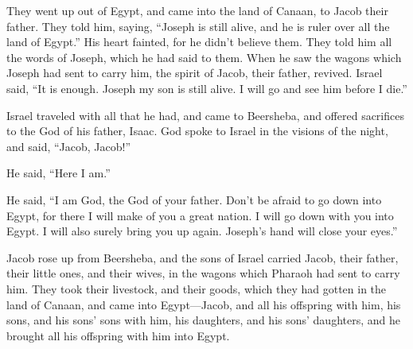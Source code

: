 \myverse{}They went up out of Egypt, and came into the land of Canaan, to Jacob their father.  \myverse{}They told him, saying, “Joseph is still alive, and he is ruler over all the land of Egypt.” His heart fainted, for he didn’t believe them.  \myverse{}They told him all the words of Joseph, which he had said to them. When he saw the wagons which Joseph had sent to carry him, the spirit of Jacob, their father, revived.  \myverse{}Israel said, “It is enough. Joseph my son is still alive. I will go and see him before I die.”

\mychapter{}
\myverse*{}Israel traveled with all that he had, and came to Beersheba, and offered sacrifices to the God of his father, Isaac.  \myverse{}God spoke to Israel in the visions of the night, and said, “Jacob, Jacob!”

He said, “Here I am.”

\myverse{}He said, “I am God, the God of your father. Don’t be afraid to go down into Egypt, for there I will make of you a great nation.  \myverse{}I will go down with you into Egypt. I will also surely bring you up again. Joseph’s hand will close your eyes.”

\myverse{}Jacob rose up from Beersheba, and the sons of Israel carried Jacob, their father, their little ones, and their wives, in the wagons which Pharaoh had sent to carry him.  \myverse{}They took their livestock, and their goods, which they had gotten in the land of Canaan, and came into Egypt—Jacob, and all his offspring with him,  \myverse{}his sons, and his sons’ sons with him, his daughters, and his sons’ daughters, and he brought all his offspring with him into Egypt.

